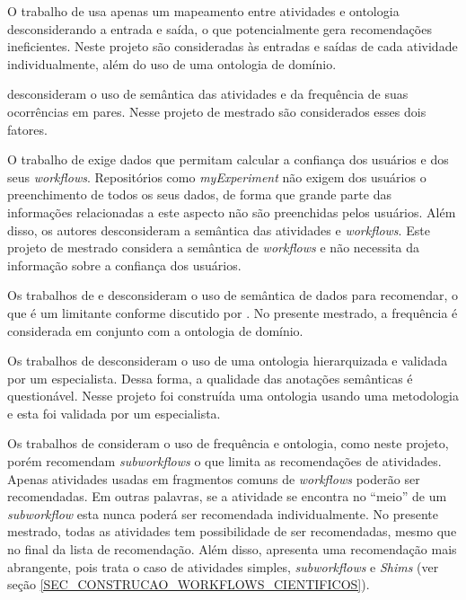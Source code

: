 \documentclass[10pt]{article}
\begin{document}
O trabalho de  usa apenas um mapeamento entre atividades e ontologia desconsiderando a entrada e saída, o que potencialmente gera recomendações ineficientes. Neste projeto são consideradas às entradas e saídas de cada atividade individualmente, além do uso de uma ontologia de domínio.

 desconsideram o uso de semântica das atividades e da frequência de suas ocorrências em pares. Nesse projeto de mestrado são considerados esses dois fatores.

O trabalho de  exige dados que permitam calcular a confiança dos usuários e dos seus \emph{workflows}. Repositórios como \emph{myExperiment} \cite{ROURE2015} não exigem dos usuários o preenchimento de todos os seus dados, de forma que grande parte das informações relacionadas a este aspecto não são preenchidas pelos usuários. Além disso, os autores desconsideram a semântica das atividades e \emph{workflows}. Este projeto de mestrado considera a semântica de \emph{workflows} e não necessita da informação sobre a confiança dos usuários.

Os trabalhos de  e  desconsideram o uso de semântica de dados para recomendar, o que é um limitante conforme discutido por . No presente mestrado, a frequência é considerada em conjunto com a ontologia de domínio.

Os trabalhos de  desconsideram o uso de uma ontologia hierarquizada e validada por um especialista. Dessa forma, a qualidade das anotações semânticas é questionável. Nesse projeto foi construída uma ontologia usando uma metodologia e esta foi validada por um especialista.

Os trabalhos de  consideram o uso de frequência e ontologia, como neste projeto, porém recomendam \emph{subworkflows} o que limita as recomendações de atividades. Apenas atividades usadas em fragmentos comuns de \emph{workflows} poderão ser recomendadas. Em outras palavras, se a atividade se encontra no ``meio'' de um \emph{subworkflow} esta nunca poderá ser recomendada individualmente. No presente mestrado, todas as atividades tem possibilidade de ser recomendadas, mesmo que no final da lista de recomendação. Além disso, apresenta uma recomendação mais abrangente, pois trata o caso de atividades simples, \emph{subworkflows} e \emph{Shims} (ver seção \ref{SEC_CONSTRUCAO_WORKFLOWS_CIENTIFICOS}).
\end{document}
